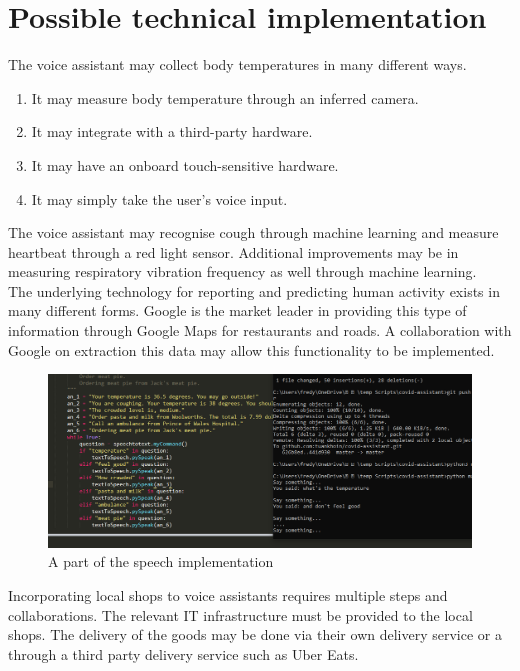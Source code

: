 \documentclass{article}
\begin{document}
\newpage

\section*{Possible technical implementation}
The voice assistant may collect body temperatures in many different ways. 

\begin{enumerate}
    \item It may measure body temperature through an inferred camera.
    \item It may integrate with a third-party hardware.
    \item It may have an onboard touch-sensitive hardware.
    \item It may simply take the user’s voice input.
\end{enumerate}

The voice assistant may recognise cough through machine learning and measure heartbeat through a red light sensor. Additional improvements may be in measuring respiratory vibration frequency as well through machine learning.\\

The underlying technology for reporting and predicting human activity exists in many different forms. Google is the market leader in providing this type of information through Google Maps for restaurants and roads. A collaboration with Google on extraction this data may allow this functionality to be implemented.\\

\begin{figure}
        \centering
        \includegraphics[scale=0.3]{code.png}
        \caption{A part of the speech implementation}
        \label{fig:GD}
\end{figure}

Incorporating local shops to voice assistants requires multiple steps and collaborations. The relevant IT infrastructure must be provided to the local shops. The delivery of the goods may be done via their own delivery service or a through a third party delivery service such as Uber Eats.
\end{document}
